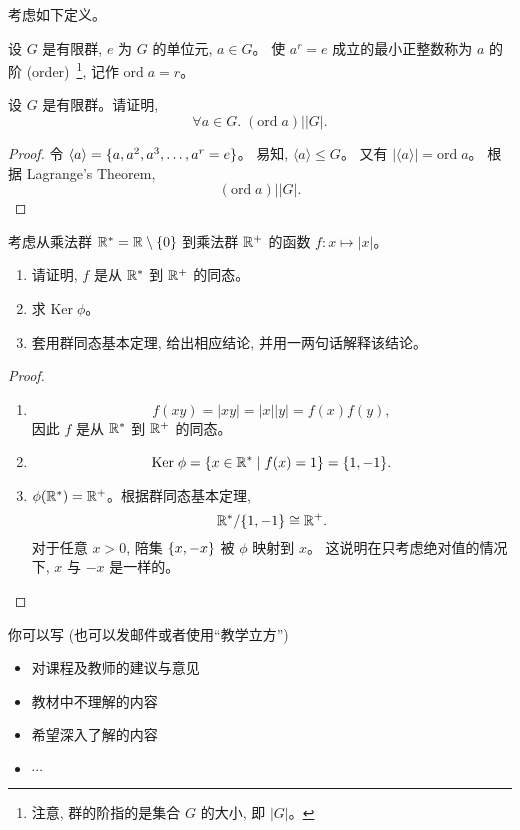 \documentclass[a4paper, justified]{tufte-handout}
\begin{document}
\begin{problem}
  考虑如下定义。
  \begin{definition}[元素的阶]
    设 $G$ 是有限群, $e$ 为 $G$ 的单位元, $a \in G$。
    使 $a^{r} = e$ 成立的最小正整数称为 $a$ 的阶
    (order)~\footnote{注意, 群的阶指的是集合 $G$ 的大小, 即 $|G|$。},
    记作 $\text{ord}\; a = r$。
  \end{definition}
  设 $G$ 是有限群。请证明,
  \[
    \forall a \in G.\; (\text{ord}\; a) \big\vert |G|.
  \]
\end{problem}

\begin{proof}
  令 $\langle a \rangle = \{a, a^{2}, a^{3}, \dots, a^{r} = e\}$。
  易知, $\langle a \rangle \le G$。
  又有 $|\langle a \rangle| = \text{ord}\; a$。
  根据 Lagrange's Theorem,
  \[
    (\text{ord}\; a) \big\vert |G|.
  \]
\end{proof}

\begin{problem}[\score{5 = 2 + 1 + 2} $\star\star\star$]
  考虑从乘法群 $\mathbb{R}^{\ast} = \mathbb{R} \setminus \{0\}$
  到乘法群 $\mathbb{R}^{+}$ 的函数 $f: x \mapsto |x|$。
  \begin{enumerate}[(1)]
    \item 请证明, $f$ 是从 $\mathbb{R}^{\ast}$ 到 $\mathbb{R}^{+}$ 的同态。
    \item 求 $\text{Ker}\; \phi$。
    \item 套用群同态基本定理, 给出相应结论, 并用一两句话解释该结论。
  \end{enumerate}
\end{problem}

\begin{proof}
  \begin{enumerate}[(1)]
    \item
      \[
        f(xy) = |xy| = |x| |y| = f(x) f(y),
      \]
      因此 $f$ 是从 $\mathbb{R}^{\ast}$ 到 $\mathbb{R}^{+}$ 的同态。
    \item
      \[
        \text{Ker}\; \phi = \{x \in \mathbb{R}^{\ast} \mid f(x) = 1\} = \{1, -1\}.
      \]
    \item $\phi(\mathbb{R}^{\ast}) = \mathbb{R}^{+}$。根据群同态基本定理,
      \[
        \mathbb{R}^{\ast}/\{1, -1\} \cong \mathbb{R}^{+}.
      \]
      对于任意 $x > 0$, 陪集 $\{x, -x\}$ 被 $\phi$ 映射到 $x$。
      这说明在只考虑绝对值的情况下, $x$ 与 $-x$ 是一样的。
  \end{enumerate}
\end{proof}

\begincorrection

\beginfb

你可以写 (也可以发邮件或者使用``教学立方'')
\begin{itemize}
  \item 对课程及教师的建议与意见
  \item 教材中不理解的内容
  \item 希望深入了解的内容
  \item $\cdots$
\end{itemize}
\end{document}
